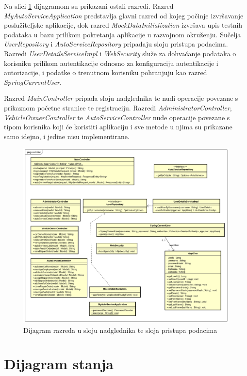 		Na slici \ref{fig:classdiagramctrl} dijagramom su prikazani ostali razredi. Razred \textit{MyAutoServiceApplication} predstavlja glavni razred od kojeg počinje izvršavanje poslužiteljske aplikacije, dok razred \textit{MockDataInitialization} izvršava upis testnih podataka u bazu prilikom pokretanja aplikacije u razvojnom okruženju. Sučelja \textit{UserRepository} i \textit{AutoServiceRepository} pripadaju sloju pristupa podacima. Razredi \textit{UserDetailsServiceImpl} i \textit{WebSecurity} služe za dohvaćanje podataka o korisniku prilikom autentikacije odnosno za konfiguraciju autentikacije i autorizacije, i podatke o trenutnom korisniku pohranjuju kao razred \textit{SpringCurrentUser}.
		
		Razred \textit{MainController} pripada sloju nadglednika te nudi operacije povezane s prikaznom početne stranice te registraciju. Razredi \textit{AdministratorController}, \textit{VehicleOwnerController} te \textit{AutoServiceController} nude operacije povezane s tipom korisnika koji će koristiti aplikaciju i sve metode u njima su prikazane samo idejno, i jedine nisu implementirane.
		
		\begin{figure}[H]
			\centering
			\includegraphics[width=0.9\linewidth]{dijagrami/class_diagram_ctrl}
			\caption{Dijagram razreda u sloju nadglednika te sloja pristupa podacima}
			\label{fig:classdiagramctrl}
		\end{figure}
	
		
			
			
			\eject
		
		\section{Dijagram stanja}
			
